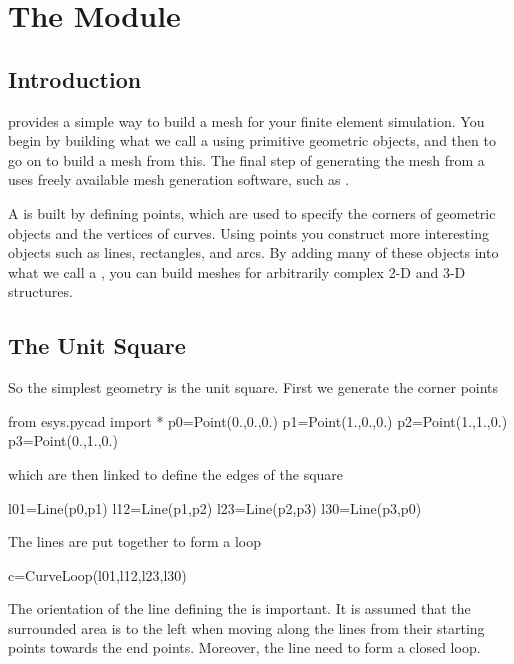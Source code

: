 
%
%
%



\chapter{The Module \pycad} \label{PYCAD CHAP}


\section{Introduction}

\pycad provides a simple way to build a mesh for your finite element
simulation.  You begin by building what we call a  using
primitive geometric objects, and then to go on to build a mesh from
this.  The final step of generating the mesh from a  
uses freely available mesh generation software, such as \gmshextern.

A  is built by defining points, which are used to specify
the corners of geometric objects and the vertices of curves.  Using
points you construct more interesting objects such as lines,
rectangles, and arcs.  By adding many of these objects into what we
call a , you can build meshes for arbitrarily complex 2-D
and 3-D structures.

\section{The Unit Square}
So the simplest geometry is the unit square. First we generate the 
corner points
\begin{python}
from esys.pycad import *
p0=Point(0.,0.,0.)
p1=Point(1.,0.,0.)
p2=Point(1.,1.,0.)
p3=Point(0.,1.,0.)
\end{python}
which are then linked to define the edges of the square
\begin{python}
l01=Line(p0,p1)
l12=Line(p1,p2)
l23=Line(p2,p3)
l30=Line(p3,p0)
\end{python}
The lines are put together to form a loop 
\begin{python}
c=CurveLoop(l01,l12,l23,l30)
\end{python}
The orientation of the line defining the  is important. It is assumed that the surrounded 
area is to the left when moving along the lines from their starting points towards the end points. Moreover,
the line need to form a closed loop.  

